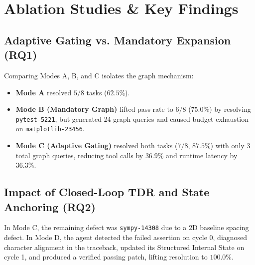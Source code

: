 \documentclass[10pt,twocolumn,letterpaper]{article}
\begin{document}
\section{Ablation Studies \& Key Findings}

\subsection{Adaptive Gating vs. Mandatory Expansion (RQ1)}
Comparing Modes A, B, and C isolates the graph mechanism:
\begin{itemize}
    \item \textbf{Mode A} resolved $5/8$ tasks ($62.5\%$).
    \item \textbf{Mode B (Mandatory Graph)} lifted pass rate to $6/8$ ($75.0\%$) by resolving \texttt{pytest-5221}, but generated 24 graph queries and caused budget exhaustion on \texttt{matplotlib-23456}.
    \item \textbf{Mode C (Adaptive Gating)} resolved both tasks ($7/8$, $87.5\%$) with only 3 total graph queries, reducing tool calls by $36.9\%$ and runtime latency by $36.3\%$.
\end{itemize}

\subsection{Impact of Closed-Loop TDR and State Anchoring (RQ2)}
In Mode C, the remaining defect was \texttt{sympy-14308} due to a 2D baseline spacing defect. In Mode D, the agent detected the failed assertion on cycle 0, diagnosed character alignment in the traceback, updated its Structured Internal State on cycle 1, and produced a verified passing patch, lifting resolution to $100.0\%$.
\end{document}
